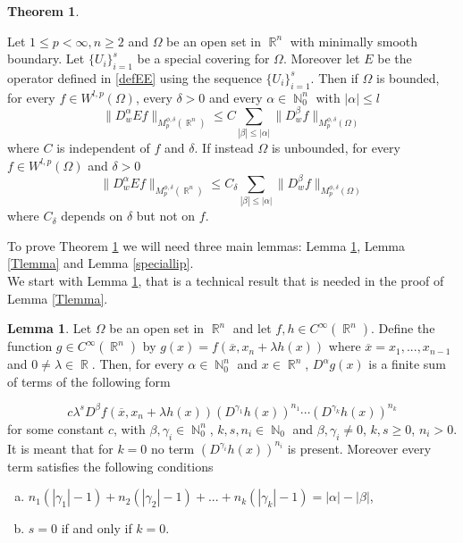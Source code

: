 \documentclass[12pt]{article}
\theoremstyle{definition}
\newtheorem{theorem}{Theorem}
\newtheorem{lemma}{Lemma}
\DeclareMathOperator\rr{\mathbb{R}}
\DeclareMathOperator\nn{\mathbb{N}}
\begin{document}
\begin{theorem}\label{mains}

Let $1\le p<\infty,n\ge2$ and $\Omega$ be an open set in $\rr^n$ with minimally smooth boundary. Let $\{ U_i\}_{i=1}^s$ be a special covering for $\Omega.$ Moreover let $E$ be the operator defined in \eqref{defEE} using the sequence $\{ U_i\}_{i=1}^s$. Then if $\Omega$ is bounded, for every $f \in W^{l,p}(\Omega)$, every $\delta>0$ and every $\alpha \in \nn_0^n$ with $|\alpha|\le l$ 
\begin{equation}
 \| D^\alpha_w Ef\|_{M_p^{\phi,\delta}(\rr^n)}\le C\sum_{|\beta|\le |\alpha|}\|D^\beta_w f \|_{M_p^{\phi,\delta}(\Omega)} \label{Ebound1}
 \end{equation}
 where $C$ is independent of $f$ and $\delta.$ If instead $\Omega$ is unbounded, for every $f \in W^{l,p}(\Omega)$ and $\delta>0$
\begin{equation}
 \| D^\alpha_w Ef\|_{M_p^{\phi,\delta}(\rr^n)}\le C_\delta\sum_{|\beta|\le |\alpha|}\|D^\beta_w f \|_{M_p^{\phi,\delta}(\Omega)} \label{Ebound2}
 \end{equation}
 where $C_\delta$ depends on $\delta$ but not on $f.$
\end{theorem}

To prove Theorem \ref{mains} we will need three main lemmas: Lemma \ref{derivatives}, Lemma \ref{Tlemma} and Lemma \ref{speciallip}. \\
We start with Lemma \ref{derivatives}, that is a technical result that is needed in the proof of Lemma \ref{Tlemma}.


\begin{lemma}\label{derivatives}
Let $\Omega$ be an open set in $\rr^n$ and let $f,h \in C^\infty(\rr^n)$. Define the function $g\in C^\infty(\rr^n)$ by $g(x)=f(\overline x, x_n+\lambda h(x))$ where $\overline x=x_1,...,x_{n-1}$ and $0\neq\lambda \in \rr.$ Then, for every $\alpha \in \nn_0^n$ and $x \in \rr^n$, $D^\alpha g(x)$ is a finite sum of terms of the following form

\[
c\lambda^s D^{\beta} f(\overline x, x_n+\lambda h(x))(D^{\gamma_1}h(x))^{n_1}\cdots (D^{\gamma_k}h(x))^{n_k}
\]
for some constant $c$, with $\beta,\gamma_i \in \nn_0^n $, $k,s,n_i \in \nn_0$ and $\beta,\gamma_i\neq0$, $k,s\ge 0$, $n_i>0$. It is meant that for $k=0$ no term $(D^{\gamma_i}h(x))^{n_i}$ is present. Moreover every term satisfies the following conditions
\begin{enumerate}[a)]
\item $n_1(|\gamma_1|-1)+n_2(|\gamma_2|-1)+...+n_k(|\gamma_k|-1)=|\alpha|-|\beta|$,
\item  $s=0$ if and only if $k=0$.
\end{enumerate}
\end{lemma}
\end{document}
